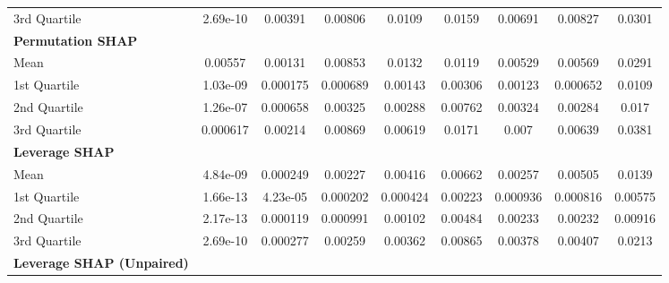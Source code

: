 {\begin{tabular} {lcccccccc}
\hspace{7pt}3rd Quartile & 2.69e-10 & 0.00391 & 0.00806 & 0.0109 & 0.0159 & 0.00691 & 0.00827 & 0.0301 \\
\addlinespace[1ex]
\textbf{Permutation SHAP} &  &  &  &  &  &  &  &  \\
\hspace{7pt}Mean & 0.00557 & 0.00131 & 0.00853 & 0.0132 & 0.0119 & 0.00529 & 0.00569 & 0.0291 \\
\hspace{7pt}1st Quartile & 1.03e-09 & 0.000175 & 0.000689 & 0.00143 & 0.00306 & 0.00123 & \cellcolor{gold!60}0.000652 & 0.0109 \\
\hspace{7pt}2nd Quartile & 1.26e-07 & 0.000658 & 0.00325 & 0.00288 & 0.00762 & 0.00324 & 0.00284 & 0.017 \\
\hspace{7pt}3rd Quartile & 0.000617 & 0.00214 & 0.00869 & 0.00619 & 0.0171 & 0.007 & 0.00639 & 0.0381 \\
\addlinespace[1ex]
\textbf{Leverage SHAP} &  &  &  &  &  &  &  &  \\
\hspace{7pt}Mean & \cellcolor{gold!60}4.84e-09 & \cellcolor{gold!60}0.000249 & \cellcolor{gold!60}0.00227 & \cellcolor{silver!60}0.00416 & \cellcolor{bronze!60}0.00662 & \cellcolor{gold!60}0.00257 & \cellcolor{bronze!60}0.00505 & \cellcolor{silver!60}0.0139 \\
\hspace{7pt}1st Quartile & \cellcolor{silver!60}1.66e-13 & \cellcolor{silver!60}4.23e-05 & \cellcolor{gold!60}0.000202 & \cellcolor{gold!60}0.000424 & \cellcolor{gold!60}0.00223 & \cellcolor{bronze!60}0.000936 & \cellcolor{silver!60}0.000816 & \cellcolor{gold!60}0.00575 \\
\hspace{7pt}2nd Quartile & \cellcolor{gold!60}2.17e-13 & \cellcolor{silver!60}0.000119 & \cellcolor{silver!60}0.000991 & \cellcolor{silver!60}0.00102 & \cellcolor{gold!60}0.00484 & \cellcolor{silver!60}0.00233 & \cellcolor{silver!60}0.00232 & \cellcolor{gold!60}0.00916 \\
\hspace{7pt}3rd Quartile & \cellcolor{silver!60}2.69e-10 & \cellcolor{gold!60}0.000277 & \cellcolor{gold!60}0.00259 & \cellcolor{silver!60}0.00362 & \cellcolor{silver!60}0.00865 & \cellcolor{gold!60}0.00378 & \cellcolor{gold!60}0.00407 & \cellcolor{bronze!60}0.0213 \\
\addlinespace[1ex]
\textbf{Leverage SHAP (Unpaired)} &  &  &  &  &  &  &  &  \\

\end{tabular}}
